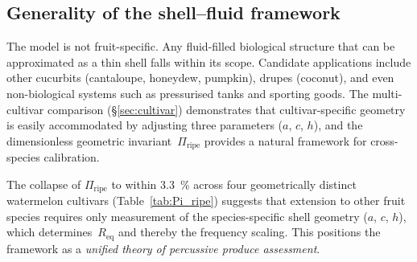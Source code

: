 \subsection{Generality of the shell--fluid framework}
\label{sec:generality}

The model is not fruit-specific.  Any fluid-filled biological structure
that can be approximated as a thin shell falls within its
scope.  Candidate applications include other cucurbits (cantaloupe,
honeydew, pumpkin), drupes (coconut), and even non-biological systems
such as pressurised tanks and sporting goods.  The multi-cultivar
comparison (\S\ref{sec:cultivar}) demonstrates that cultivar-specific
geometry is easily accommodated by adjusting three parameters ($a$, $c$,
$h$), and the dimensionless geometric invariant~$\Pi_{\mathrm{ripe}}$
provides a natural framework for cross-species calibration.

The collapse of $\Pi_{\mathrm{ripe}}$ to within
\SI{3.3}{\percent} across four geometrically distinct watermelon
cultivars (Table~\ref{tab:Pi_ripe}) suggests that extension to other
fruit species requires only measurement of the species-specific
shell geometry ($a$, $c$, $h$), which determines~$R_{\mathrm{eq}}$
and thereby the frequency scaling.  This positions the framework as a
\emph{unified theory of percussive produce assessment}.
